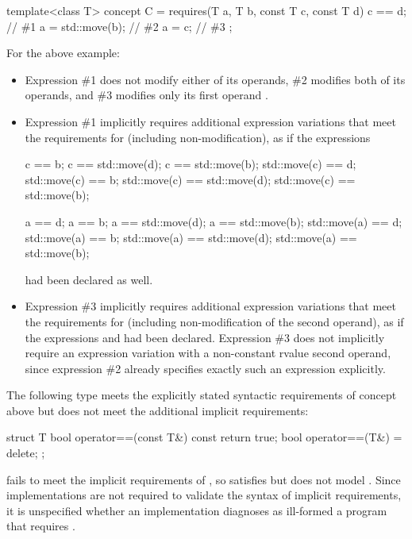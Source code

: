 \pnum
\begin{example}
\begin{codeblock}
template<class T> concept C = requires(T a, T b, const T c, const T d) {
  c == d;           // \#1
  a = std::move(b); // \#2
  a = c;            // \#3
};
\end{codeblock}

For the above example:
\begin{itemize}
\item
Expression \#1 does not modify either of its operands, \#2 modifies both of its
operands, and \#3 modifies only its first operand .

\item
Expression \#1 implicitly requires additional expression variations that meet
the requirements for  (including non-modification), as if the
expressions
\begin{codeblock}
                                            c  ==           b;
          c  == std::move(d);               c  == std::move(b);
std::move(c) ==           d;      std::move(c) ==           b;
std::move(c) == std::move(d);     std::move(c) == std::move(b);

          a  ==           d;                a  ==           b;
          a  == std::move(d);               a  == std::move(b);
std::move(a) ==           d;      std::move(a) ==           b;
std::move(a) == std::move(d);     std::move(a) == std::move(b);
\end{codeblock}
had been declared as well.

\item
Expression \#3 implicitly requires additional expression variations that meet
the requirements for  (including non-modification of the second
operand), as if the expressions  and  had
been declared. Expression \#3 does not implicitly require an expression
variation with a non-constant rvalue second operand, since expression \#2
already specifies exactly such an expression explicitly.
\end{itemize}
\end{example}

\pnum
\begin{example}
The following type  meets the explicitly stated syntactic requirements
of concept  above but does not meet the additional implicit
requirements:

\begin{codeblock}
struct T {
  bool operator==(const T&) const { return true; }
  bool operator==(T&) = delete;
};
\end{codeblock}

 fails to meet the implicit requirements of ,
so  satisfies but does not model .
Since implementations are not required to validate the syntax
of implicit requirements, it is unspecified whether an implementation diagnoses
as ill-formed a program that requires .
\end{example}

